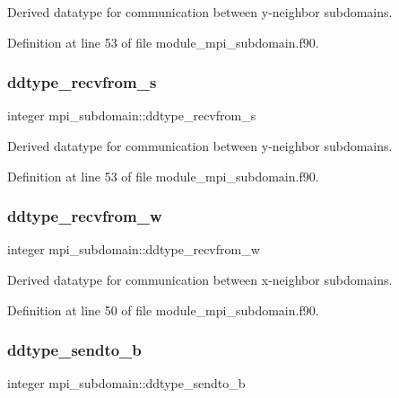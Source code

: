 Derived datatype for communication between y-\/neighbor subdomains. 



Definition at line 53 of file module\+\_\+mpi\+\_\+subdomain.\+f90.

\mbox{\label{namespacempi__subdomain_a1f46916f08758533cad3ecac33233e38}} 
\subsubsection{\texorpdfstring{ddtype\_recvfrom\_s}{ddtype\_recvfrom\_s}}
{\footnotesize\ttfamily integer mpi\+\_\+subdomain\+::ddtype\+\_\+recvfrom\+\_\+s}



Derived datatype for communication between y-\/neighbor subdomains. 



Definition at line 53 of file module\+\_\+mpi\+\_\+subdomain.\+f90.

\mbox{\label{namespacempi__subdomain_a0b2a4ab6d6a88a3817f473a5c2c172b9}} 
\subsubsection{\texorpdfstring{ddtype\_recvfrom\_w}{ddtype\_recvfrom\_w}}
{\footnotesize\ttfamily integer mpi\+\_\+subdomain\+::ddtype\+\_\+recvfrom\+\_\+w}



Derived datatype for communication between x-\/neighbor subdomains. 



Definition at line 50 of file module\+\_\+mpi\+\_\+subdomain.\+f90.

\mbox{\label{namespacempi__subdomain_a7a2af0322a7aaa435951a5432859687a}} 
\subsubsection{\texorpdfstring{ddtype\_sendto\_b}{ddtype\_sendto\_b}}
{\footnotesize\ttfamily integer mpi\+\_\+subdomain\+::ddtype\+\_\+sendto\+\_\+b}



